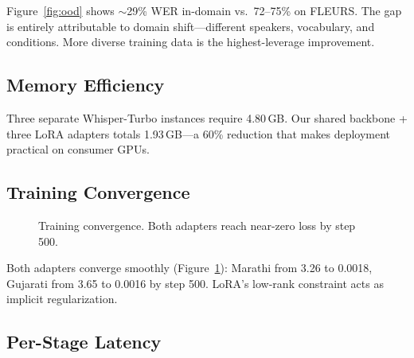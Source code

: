 \documentclass[11pt]{article}
\begin{document}
Figure~\ref{fig:ood} shows $\sim$29\% WER in-domain vs.\ 72--75\% on FLEURS.  The gap is entirely attributable to domain shift---different speakers, vocabulary, and conditions.  More diverse training data is the highest-leverage improvement.

\subsection{Memory Efficiency}

Three separate Whisper-Turbo instances require 4.80\,GB.  Our shared backbone + three LoRA adapters totals 1.93\,GB---a 60\% reduction that makes deployment practical on consumer GPUs.

\subsection{Training Convergence}

\begin{figure}[t]
\centering
{}
\caption{Training convergence.  Both adapters reach near-zero loss by step 500.}
\label{fig:loss}
\end{figure}

Both adapters converge smoothly (Figure~\ref{fig:loss}): Marathi from 3.26 to 0.0018, Gujarati from 3.65 to 0.0016 by step 500.  LoRA's low-rank constraint acts as implicit regularization.

\subsection{Per-Stage Latency}
\end{document}
